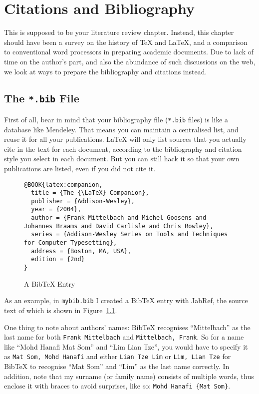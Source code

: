 \chapter{Citations and Bibliography}\label{chap:review}

This is supposed to be your literature review chapter. Instead, this chapter should have been a survey on the history of \TeX{} and \LaTeX{}, and a comparison to conventional word processors in preparing academic documents.  Due to lack of time on the author's part, and also the abundance of such discussions on the web, we look at ways to prepare the bibliography and citations instead.

\section{The \texttt{*.bib} File}
First of all, bear in mind that your bibliography file (\verb|*.bib| files) is like a database like Mendeley.  That means you can maintain a centralised list, and reuse it for all your publications.  \LaTeX{} will only list sources that you actually cite in the text for each document, according to the bibliography and citation style you select in each document.  But you can still hack it so that your own publications are listed, even if you did not cite it.
 

\begin{figure}[htb!]
\begin{lstlisting}[language={}]
@BOOK{latex:companion,
  title = {The {\LaTeX} Companion},
  publisher = {Addison-Wesley},
  year = {2004},
  author = {Frank Mittelbach and Michel Goosens and Johannes Braams and David Carlisle and Chris Rowley},
  series = {Addison-Wesley Series on Tools and Techniques for Computer Typesetting},
  address = {Boston, MA, USA},
  edition = {2nd}
}
\end{lstlisting}
\caption{A BibTeX Entry}\label{fig:bibtex}
\end{figure}

As an example, in \verb|mybib.bib| I created a Bib\TeX{} entry with JabRef, the source text of which is shown in Figure~\ref{fig:bibtex}.

One thing to note about authors' names: Bib\TeX{} recognises ``Mittelbach'' as the last name for both \texttt{Frank Mittelbach} and \texttt{Mittelbach, Frank}.  So for a name like ``Mohd Hanafi Mat Som'' and ``Lim Lian Tze'', you would have to specify it as \texttt{Mat Som, Mohd Hanafi} and either \texttt{Lian Tze Lim} or \texttt{Lim, Lian Tze} for Bib\TeX{} to recognise ``Mat Som'' and ``Lim'' as the last name correctly.  In addition, note that my surname (or family name) consists of multiple words, thus enclose it with braces to avoid surprises, like so: \texttt{Mohd Hanafi \{Mat Som\}}.

